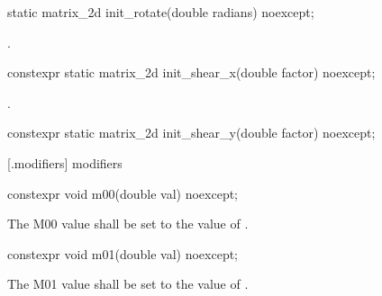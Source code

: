 \begin{itemdecl}
static matrix_2d init_rotate(double radians) noexcept;
\end{itemdecl}
\begin{itemdescr}
\pnum
\returns
{}.
\end{itemdescr}

\begin{itemdecl}
constexpr static matrix_2d init_shear_x(double factor) noexcept;
\end{itemdecl}
\begin{itemdescr}
\pnum
\returns
{}.
\end{itemdescr}

\begin{itemdecl}
constexpr static matrix_2d init_shear_y(double factor) noexcept;
\end{itemdecl}
\begin{itemdescr}
\pnum
\returns
{}
\end{itemdescr}

 [\matrixtwod.modifiers] { modifiers}

\begin{itemdecl}
constexpr void m00(double val) noexcept;
\end{itemdecl}
\begin{itemdescr}
\pnum
\effects
The M00 value shall be set to the value of .
\end{itemdescr}

\begin{itemdecl}
constexpr void m01(double val) noexcept;
\end{itemdecl}
\begin{itemdescr}
\pnum
\effects
The M01 value shall be set to the value of .
\end{itemdescr}

